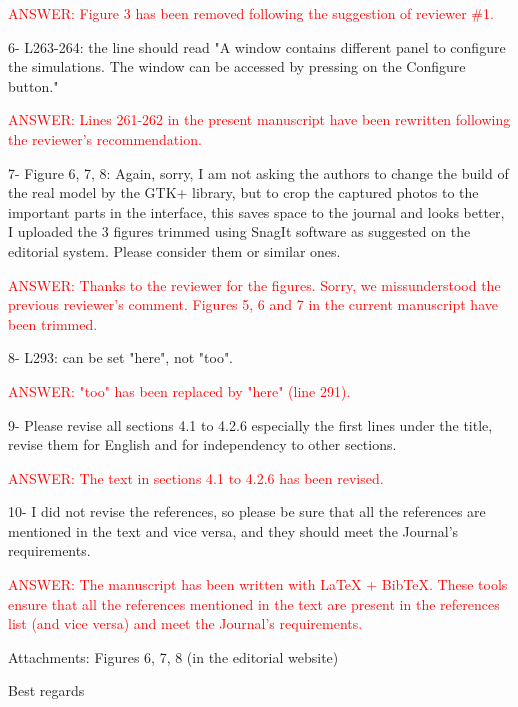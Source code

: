 \documentclass[a4paper]{article}
\begin{document}
\textcolor{red}{ANSWER: Figure 3 has been removed following the suggestion of reviewer \#1.}

6-	L263-264: the line should read "A window contains different panel to configure the simulations. The window can be accessed by pressing on the Configure button."

\textcolor{red}{ANSWER: Lines 261-262 in the present manuscript have been rewritten following the reviewer's recommendation.}

7-	Figure 6, 7, 8: Again, sorry, I am not asking the authors to change the build of the real model by the GTK+ library, but to crop the captured photos to the important parts in the interface, this saves space to the journal and looks better, I uploaded the 3 figures trimmed using SnagIt software as suggested on the editorial system. Please consider them or similar ones.

\textcolor{red}{ANSWER: Thanks to the reviewer for the figures. Sorry, we missunderstood the previous reviewer's comment. Figures 5, 6 and 7 in the current manuscript have been trimmed.}

8-	L293: can be set "here", not "too".

\textcolor{red}{ANSWER: "too" has been replaced by "here" (line 291).}

9-	Please revise all sections 4.1 to 4.2.6 especially the first lines under the title, revise them for English and for independency to other sections.

\textcolor{red}{ANSWER: The text in sections 4.1 to 4.2.6 has been revised.}

10-	I did not revise the references, so please be sure that all the references are mentioned in the text and vice versa, and they should meet the Journal's requirements.

\textcolor{red}{ANSWER: The manuscript has been written with LaTeX + BibTeX. These tools ensure that all the references mentioned in the text are present in the
references list (and vice versa) and meet the Journal's requirements.}

Attachments: Figures 6, 7, 8 (in the editorial website)

Best regards
\end{document}
